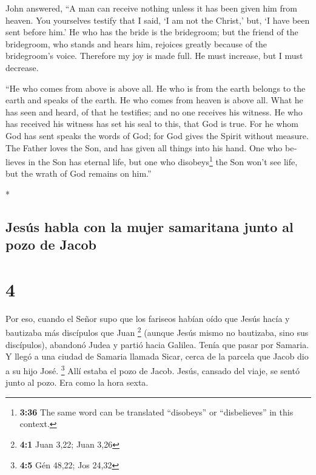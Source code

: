\begin{paracol}{2}
\begin{otherlanguage}{english}
 John answered, ``A man can receive nothing unless it has
been given him from heaven.  You yourselves testify that
I said, `I am not the Christ,' but, `I have been sent before him.'
 He who has the bride is the bridegroom; but the friend
of the bridegroom, who stands and hears him, rejoices greatly because of
the bridegroom's voice. Therefore my joy is made full. 
He must increase, but I must decrease.

 ``He who comes from above is above all. He who is from
the earth belongs to the earth and speaks of the earth. He who comes
from heaven is above all.  What he has seen and heard, of
that he testifies; and no one receives his witness.  He
who has received his witness has set his seal to this, that God is true.
 For he whom God has sent speaks the words of God; for
God gives the Spirit without measure.  The Father loves
the Son, and has given all things into his hand.  One who
believes in the Son has eternal life, but one who disobeys\footnote{\textbf{3:36}
  The same word can be translated ``disobeys'' or ``disbelieves'' in
  this context.} the Son won't see life, but the wrath of God remains on
him.''

\end{otherlanguage}

\switchcolumn[0]*

\hypertarget{jesuxfas-habla-con-la-mujer-samaritana-junto-al-pozo-de-jacob}{%
\subsection{Jesús habla con la mujer samaritana junto al pozo de
Jacob}\label{jesuxfas-habla-con-la-mujer-samaritana-junto-al-pozo-de-jacob}}

\hypertarget{section-6}{%
\section{4}\label{section-6}}

 Por eso, cuando el Señor supo que los fariseos habían
oído que Jesús hacía y bautizaba más discípulos que Juan \footnote{\textbf{4:1}
  Juan 3,22; Juan 3,26}  (aunque Jesús mismo no bautizaba,
sino sus discípulos),  abandonó Judea y partió hacia
Galilea.  Tenía que pasar por Samaria.  Y
llegó a una ciudad de Samaria llamada Sicar, cerca de la parcela que
Jacob dio a su hijo José. \footnote{\textbf{4:5} Gén 48,22; Jos 24,32}
 Allí estaba el pozo de Jacob. Jesús, cansado del viaje,
se sentó junto al pozo. Era como la hora sexta.


\end{paracol}
